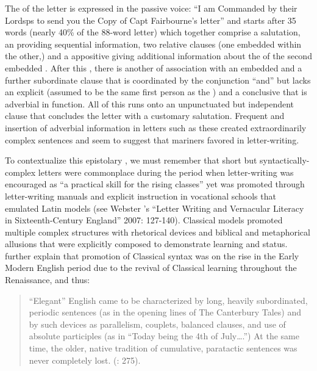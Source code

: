 The  of the letter is expressed in the passive voice: “I am Commanded by their Lordsps to send you the Copy of Capt Fairbourne’s letter” and starts after 35 words (nearly 40\% of the 88-word letter) which together comprise a  salutation, an  providing sequential information, two relative clauses (one embedded within the other,) and a  appositive giving additional information about the  of the second embedded . After this , there is another  of association with an embedded  and a further subordinate clause that is coordinated by the conjunction “and” but lacks an explicit  (assumed to be the same first person as the ) and a conclusive  that is adverbial in function. All of this runs onto an unpunctuated but independent clause that concludes the letter with a customary salutation. Frequent  and insertion of adverbial information in letters such as these created extraordinarily complex sentences and seem to suggest that mariners favored  in letter-writing.  

To contextualize this epistolary , we must remember that short but syntactically-complex letters were commonplace during the period when letter-writing was encouraged as “a practical skill for the rising classes” \citep[178,]{Mitchell2007} yet was promoted through letter-writing manuals and explicit instruction in vocational schools that emulated Latin models (see Webster \citeauthor{Newbold2007}’s “Letter Writing and Vernacular Literacy in Sixteenth-Century England” 2007: 127-140). Classical models promoted multiple complex structures with rhetorical devices and biblical and metaphorical allusions that were explicitly composed to demonstrate learning and status. \citet{MillwardHayes2012} further explain that promotion of Classical syntax was on the rise in the Early Modern English period due to the revival of Classical learning throughout the Renaissance, and thus:

\begin{quotation}
“Elegant” English came to be characterized by long, heavily subordinated, periodic sentences (as in the opening lines of The Canterbury Tales) and by such devices as parallelism, couplets, balanced clauses, and use of absolute participles (as in “Today being the 4th of July….”) At the same time, the older, native tradition of cumulative, paratactic sentences was never completely lost. (\citealt{MillwardHayes2012}: 275).
\end{quotation}

